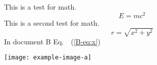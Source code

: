 \documentclass{article}
\begin{document}
    This is a test for math.
    \begin{equation}
        E=mc^2 \label{eq:1}
    \end{equation}
    This is a second test for math.
    \begin{equation}
        r = \sqrt{x^2 + y^2} \label{eq:2}
    \end{equation}
    In document B Eq.~~(\ref{B-eq:x}) 

  { \centering
    \captionsetup{type=figure}
    \texttt{[image: example-image-a]}
  \par}
\end{document}
